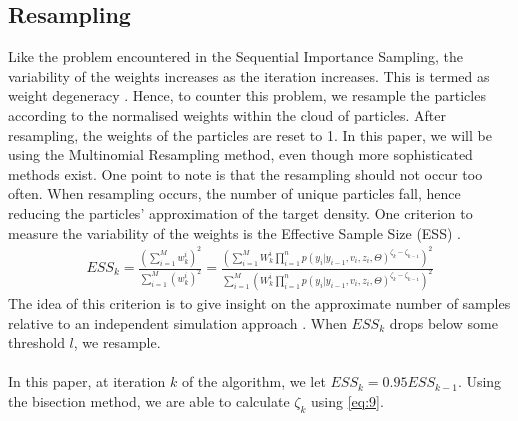 \documentclass[12pt]{article}
\theoremstyle{definition}
\begin{document}
\subsection{Resampling}
Like the problem encountered in the Sequential Importance Sampling, the variability of the weights increases as the iteration increases. This is termed as weight degeneracy \citep{doucet2001introduction}. Hence, to counter this problem, we resample the particles according to the normalised weights within the cloud of particles. After resampling, the weights of the particles are reset to 1. In this paper, we will be using the Multinomial Resampling method, even though more sophisticated methods exist. One point to note is that the resampling should not occur too often. When resampling occurs, the number of unique particles fall, hence reducing the particles' approximation of the target density. One criterion to measure the variability of the weights is the Effective Sample Size (ESS) \citep{smith2013sequential}. 
\begin{equation}\label{eq:9}
	\begin{aligned}
		ESS_{k} = \frac{(\sum_{i=1}^{M} w_{k}^{i})^{2}}{\sum_{i=1}^{M} (w_{k}^{i})^{2}}=
		\frac{(\sum_{i=1}^{M} W_{k}^{i} \prod_{i=1}^{n} p(y_{i}|y_{i-1},v_{i},z_{i},\Theta)^{\zeta_{k}-\zeta_{k-1}})^{2}}{\sum_{i=1}^{M} (W_{k}^{i}\prod_{i=1}^{n} p(y_{i}|y_{i-1},v_{i},z_{i},\Theta)^{\zeta_{k}-\zeta_{k-1}})^{2}}
	\end{aligned}
\end{equation}
The idea of this criterion is to give insight on the approximate number of samples relative to an independent simulation approach \citep{jasra2011inference}. When $ESS_{k}$ drops below some threshold $l$, we resample. \\
\\
\noindent In this paper, at iteration $k$ of the algorithm, we let $ESS_{k}=0.95ESS_{k-1}$. Using the bisection method, we are able to calculate $\zeta_{k}$ using \ref{eq:9}. 
\end{document}
